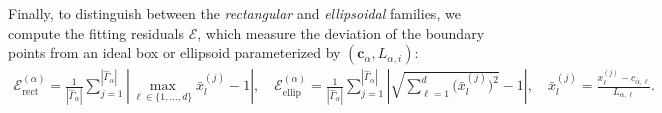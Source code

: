 \documentclass{article}
\theoremstyle{plain}
\theoremstyle{definition}
\begin{document}

 {Finally, to distinguish between the \emph{rectangular} and \emph{ellipsoidal} families, we compute the fitting residuals $\mathcal{E}$, which measure the deviation of the boundary points from an ideal box or ellipsoid parameterized by $(\boldsymbol{c}_\alpha, L_{\alpha,i})$:
\begin{equation}
\label{eq: fitting_residuals}
\begin{aligned}
    \mathcal{E}_{\mathrm{rect}}^{(\alpha)} = \frac{1}{|\hat{\Gamma}_\alpha|} \sum_{j=1}^{|\hat{\Gamma}_\alpha|}\left|\max_{\ell \in\{ 1,...,d\}} \bar{x}_l^{(j)} -1\right|, \quad
    \mathcal{E}_{\mathrm{ellip}}^{(\alpha)} = \frac{1}{|\hat{\Gamma}_\alpha|}\sum_{j=1}^{|\hat{\Gamma}_\alpha|}\left|\sqrt{\sum_{\ell=1}^{d}\bigl( \bar{x}_l^{(j)} \bigr)^2}-1 \right|,
    \quad \bar{x}_l^{(j)} = \frac{x^{(j)}_{\ell} - c_{\alpha,\ell}}{L_{\alpha,\ell}}.
\end{aligned}
\end{equation}}
  
\end{document}
